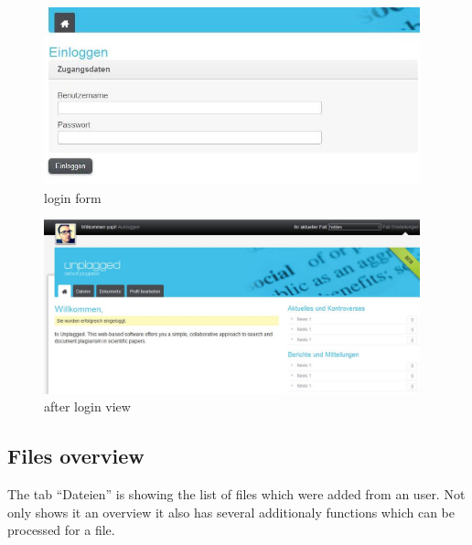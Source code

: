 \begin{figure}[!ht]
  \centering
    \includegraphics[width=0.97\textwidth]{images/basic_functionalities/login_form.jpg}
  \caption{login form}
  \label{fig:einloggen}
\end{figure}

\begin{figure}[!ht]
  \centering
    \includegraphics[width=0.97\textwidth]{images/basic_functionalities/after_login.jpg}
  \caption{after login view}
  \label{fig:einloggen}
\end{figure}

\subsection{Files overview}

The tab \enquote{Dateien} is showing the list of files which were added from an user. Not only shows it an overview it 
also has several additionaly functions which can be processed for a file.

